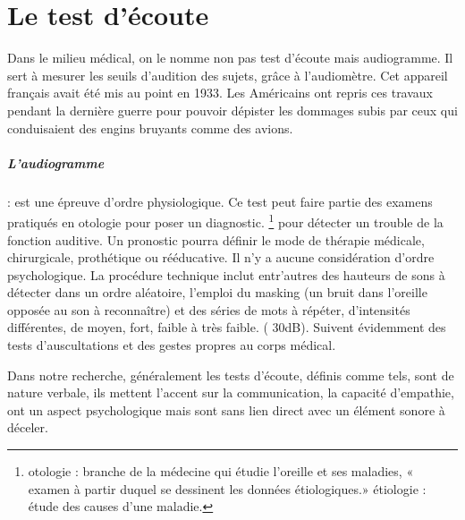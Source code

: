 \chapter{Le test d'écoute}
Dans le milieu médical, on le nomme non pas test d'écoute mais audiogramme. Il
sert à mesurer les seuils d'audition des sujets, grâce à l'audiomètre. Cet 
appareil français avait été mis au point en 1933. Les Américains
ont repris ces travaux pendant la dernière guerre pour pouvoir dépister
les dommages subis par ceux qui conduisaient des engins bruyants comme
des avions.

\paragraph*{L'audiogramme}:  est une épreuve d'ordre physiologique. Ce test peut faire partie des examens  pratiqués en otologie pour poser un diagnostic. \footnote{otologie : branche de la médecine
  qui étudie l'oreille et ses maladies, « examen à partir duquel se
  dessinent les données étiologiques.» étiologie : étude des causes
  d'une maladie.} pour détecter un trouble de la fonction auditive. Un pronostic pourra définir le mode de thérapie
médicale, chirurgicale, prothétique ou rééducative.
Il n'y a aucune considération d'ordre psychologique. La procédure technique inclut entr'autres des hauteurs de sons à détecter dans un ordre aléatoire, l'emploi du masking (un bruit dans l'oreille opposée
au son à reconnaître) et des séries de
mots
à répéter, d'intensités différentes, de moyen,
fort, faible à très faible. ( 30dB). Suivent évidemment des tests d'auscultations et des gestes propres au corps médical. 

Dans notre recherche, généralement les tests d'écoute, définis comme tels, sont de nature verbale, ils mettent l'accent sur la communication, la capacité d'empathie, ont un aspect psychologique mais sont sans lien direct avec un élément sonore à déceler. 
